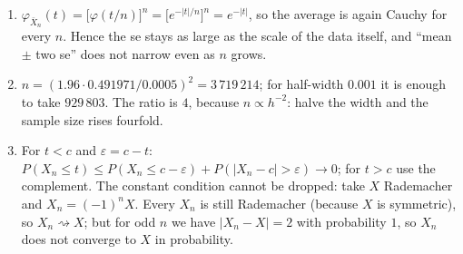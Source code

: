 \begin{enumerate}[label=\textbf{19.\arabic*}]
  \item $\varphi_{\bar X_{n}}(t)=\bigl[\varphi(t/n)\bigr]^{n}
        =\bigl[e^{-|t|/n}\bigr]^{n}=e^{-|t|}$, so the average is again Cauchy for
        every $n$. Hence the se stays as large as the scale of the data itself, and
        ``mean $\pm$ two se'' does not narrow even as $n$ grows.

  \item $n=(1.96\cdot0.491971/0.0005)^{2}=3\,719\,214$; for half-width
        $0.001$ it is enough to take $929\,803$. The ratio is $4$, because $n\propto h^{-2}$:
        halve the width and the sample size rises fourfold.

  \item For $t<c$ and $\varepsilon=c-t$:
        $P(X_{n}\le t)\le P(X_{n}\le c-\varepsilon)+P(|X_{n}-c|>\varepsilon)\to0$;
        for $t>c$ use the complement. The constant condition cannot be dropped:
        take $X$ Rademacher and $X_{n}=(-1)^{n}X$. Every $X_{n}$ is still
        Rademacher (because $X$ is symmetric), so $X_{n}\rightsquigarrow X$; but for
        odd $n$ we have $|X_{n}-X|=2$ with probability $1$, so $X_{n}$ does not
        converge to $X$ in probability.
\end{enumerate}

